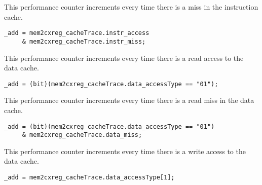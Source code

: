 
This performance counter increments every time there is a miss in the 
instruction cache.

\implementation{}
\begin{lstlisting}
_add = mem2cxreg_cacheTrace.instr_access
     & mem2cxreg_cacheTrace.instr_miss;
\end{lstlisting}


This performance counter increments every time there is a read access to the 
data cache.

\implementation{}
\begin{lstlisting}
_add = (bit)(mem2cxreg_cacheTrace.data_accessType == "01");
\end{lstlisting}


This performance counter increments every time there is a read miss in the data 
cache.

\implementation{}
\begin{lstlisting}
_add = (bit)(mem2cxreg_cacheTrace.data_accessType == "01")
     & mem2cxreg_cacheTrace.data_miss;
\end{lstlisting}


This performance counter increments every time there is a write access to the 
data cache.

\implementation{}
\begin{lstlisting}
_add = mem2cxreg_cacheTrace.data_accessType[1];
\end{lstlisting}

